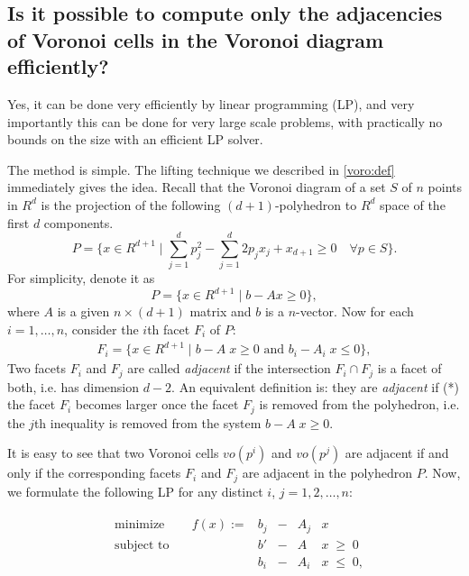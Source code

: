 \documentclass[[a4paper,12pt]{article}
\begin{document}
\subsection{Is it possible to compute only the adjacencies of Voronoi cells in
the Voronoi diagram efficiently?}
\label{voro:adjacency}

Yes, it can be done very efficiently by linear programming (LP), and
very importantly this can be done for very large scale problems,
with practically no bounds on the size with an efficient LP solver.

The method is simple.  The lifting technique we described in
\ref{voro:def} immediately gives the idea.  Recall that
the Voronoi diagram
of a set $S$ of $n$ points in $R^d$
 is the projection of the following $(d+1)$-polyhedron to
$R^d$ space of the first $d$ components.
\[
P = \{ x\in R^{d+1} \; | \;  \sum_{j=1}^d p_j^2 - \sum_{j=1}^d 2 p_j x_j + x_{d+1} \ge 0
  \quad \forall p \in S \}.
\]
For simplicity, denote it as
\[
P = \{ x\in R^{d+1} \; | \;  b - A x \ge 0 \},
\]
where $A$ is a given $n \times (d+1)$ matrix and $b$ is a $n$-vector.
Now for each $i=1,\ldots, n$, consider the $i$th facet $F_i$ of $P$:
\begin{align} \label{eq:voro_facet}
F_i = \{ x\in R^{d+1} \; | \;  b - A\; x \ge 0 \mbox{ and }
 b_i - A_i \; x \le 0 \},
\end{align} 
Two facets $F_i$ and $F_j$ are called {\em adjacent\/} if 
the intersection $F_i \cap F_j$ is a facet of both, i.e.
has dimension $d-2$. An equivalent definition is: they are
{\em adjacent\/} if (*) the facet $F_i$ becomes larger once the
facet $F_j$ is removed from the polyhedron, i.e. the $j$th
inequality is removed from the system $b - A \; x \ge 0$. 

It is easy to see that two Voronoi cells $vo(p^i)$ and $vo(p^j)$
are adjacent if and only if the corresponding facets $F_i$ and
$F_j$ are adjacent in the polyhedron $P$.
Now, we formulate the following LP for any
distinct $i$, $j = 1,2, \ldots,n$:

\begin{align} \label{eq:voro_facet_lp}
\begin{array}{lllllll}
&\text{minimize}    & \quad f(x) :=  & b_j & - &  A_j & x  \\
&\text{subject to}  &                & b'  & - &  A & x \; \ge \; 0 \\  
&                   &                & b_i & - &  A_i & x \; \le \; 0,
\end{array}
\end{align}
\end{document}
